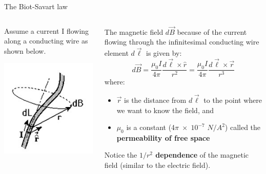 %
%
%

\begin{frame}{The Biot-Savart law}

\begin{columns}
  \begin{column}{0.40\textwidth}
     Assume a current I flowing along a conducting wire
     as shown below.\\
     \vspace{0.2cm}
     \begin{center}
       \includegraphics[width=0.99\textwidth]{./images/schematics/biot_savart.jpg}\\
      \end{center}
  \end{column}
  \begin{column}{0.60\textwidth}
     The magnetic field $d\vec{B}$ because of the current flowing through the infinitesimal
     conducting wire element $d\vec{\ell}$ is given by:
     \begin{equation*}
       d\vec{B} = \frac{\mu_0I}{4\pi} \frac{d\vec{\ell} \times \hat{r}}{r^2}
                = \frac{\mu_0I}{4\pi} \frac{d\vec{\ell} \times \vec{r}}{r^3}
     \end{equation*}
     where:
     \begin{itemize}
         \item $\vec{r}$ is the distance from $d\vec{\ell}$ to the point where we want to know the field, and\\
         \item $\mu_0$ is a constant (4$\pi\;\times\;10^{-7}$ $N/A^2$) called the {\bf permeability of free space}\\
     \end{itemize}
     \vspace{0.1cm}
     Notice the {\bf $1/r^2$ dependence} of the magnetic field (similar to the electric field).\\
  \end{column}
\end{columns}


\end{frame}
